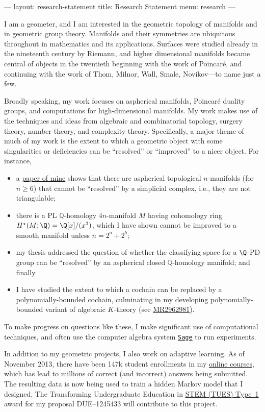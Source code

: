 ---
layout: research-statement
title: Research Statement
menu: research
---

I am a geometer, and I am interested in the geometric topology of
manifolds and in geometric group theory.  Manifolds and their
symmetries are ubiquitous throughout in mathematics and its
applications.  Surfaces were studied already in the nineteenth century
by Riemann, and higher dimensional manifolds became central of objects
in the twentieth beginning with the work of Poincar\'e, and continuing
with the work of Thom, Milnor, Wall, Smale, Novikov---to name just a
few.

Broadly speaking, my work focuses on aspherical manifolds, Poincar\'e
duality groups, and computations for high-dimensional manifolds.  My
work makes use of the techniques and ideas from algebraic and
combinatorial topology, surgery theory, number theory, and complexity
theory.  Specifically, a major theme of much of my work is the extent
to which a geometric object with some singularities or deficiencies
can be ``resolved'' or ``improved'' to a nicer object.  For instance,

\begin{itemize}
\item a \href{http://arxiv.org/abs/1304.3730}{paper of mine}
  shows that there are aspherical topological $n$-manifolds (for $n
  \geq 6$) that cannot be ``resolved'' by a simplicial complex, i.e.,
  they are not triangulable;
\item there is a PL $\mathbb{Q}$-homology $4n$-manifold $M$ having
  cohomology ring $H^\star(M;\Q) = \Q[x]/(x^3)$, which I have shown
  cannot be improved to a smooth manifold unless $n = 2^a + 2^b$;
\item my thesis addressed the question of whether the classifying
  space for a $\Q$-PD group can be ``resolved'' by an aspherical
  closed $\mathbb{Q}$-homology manifold; and finally
\item I have studied the extent to which a cochain can be replaced by
  a polynomially-bounded cochain, culminating in my developing
  polynomially-bounded variant of algebraic $K$-theory (see
  \href{http://www.ams.org/mathscinet-getitem?mr=2962981}{MR2962981}).
\end{itemize}

To make progress on questions like these, I make significant use of
computational techniques, and often use the computer algebra system
\href{http://sagemath.org/}{\texttt{Sage}} to run experiments.  

In addition to my geometric projects, I also work on adaptive
learning.  As of November 2013, there have been 147k student
enrollments in my \href{http://kisonecat.com/teaching/2014/calculus-two/}{online courses}, which has lead to millions of correct (and incorrect)
answers being submitted.  The resulting data is now being used to
train a hidden Markov model that I designed.  The Transforming
Undergraduate Education in \href{http://www.nsf.gov/funding/pgm_summ.jsp?pims_id=5741}{STEM (TUES) Type~1} award for my proposal
DUE--1245433 will contribute to this project.
